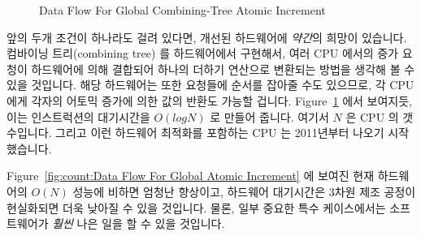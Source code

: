 {\begin{figure}[tb]
\centering
{}
\caption{Data Flow For Global Combining-Tree Atomic Increment}
\label{fig:count:Data Flow For Global Combining-Tree Atomic Increment}
\end{figure}

	앞의 두개 조건이 하나라도 걸려 있다면, 개선된 하드웨어에 \emph{약간}의
	희망이 있습니다.
	컴바이닝 트리(combining tree) 를 하드웨어에서 구현해서, 여러 CPU 에서의
	증가 요청이 하드웨어에 의해 결합되어 하나의 더하기 연산으로 변환되는
	방법을 생각해 볼 수 있을 것입니다.
	해당 하드웨어는 또한 요청들에 순서를 잡아줄 수도 있으므로, 각 CPU 에게
	각자의 어토믹 증가에 의한 값의 반환도 가능할 겁니다.
	Figure~\ref{fig:count:Data Flow For Global Combining-Tree Atomic Increment}
	에서 보여지듯, 이는 인스트럭션의 대기시간을 $O(log N)$ 로 만들어
	줍니다. 여기서 $N$ 은 CPU 의 갯수입니다.
	그리고 이런 하드웨어 최적화를 포함하는 CPU 는 2011년부터 나오기
	시작했습니다.

	Figure~\ref{fig:count:Data Flow For Global Atomic Increment} 에 보여진
	현재 하드웨어의  $O(N)$ 성능에 비하면 엄청난 향상이고, 하드웨어
	대기시간은 3차원 제조 공정이 현실화되면 더욱 낮아질 수 있을 것입니다.
	물론, 일부 중요한 특수 케이스에서는 소프트웨어가 \emph{훨씬} 나은 일을
	할 수 있을 것입니다.

} \QuickQuizEnd


